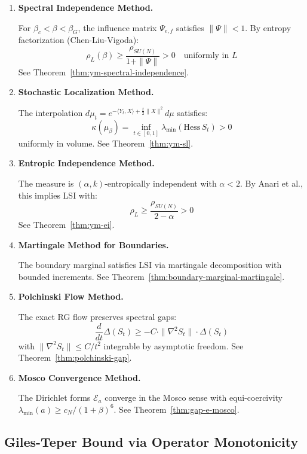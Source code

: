\begin{enumerate}[label=\textbf{M\arabic*.}]

\item \textbf{Spectral Independence Method.}

For $\beta_c < \beta < \beta_G$, the influence matrix $\Psi_{e,f}$ satisfies 
$\|\Psi\| < 1$. By entropy factorization (Chen-Liu-Vigoda):
\[
\rho_L(\beta) \geq \frac{\rho_{SU(N)}}{1 + \|\Psi\|} > 0 \quad \text{uniformly in } L
\]
See Theorem~\ref{thm:ym-spectral-independence}.

\item \textbf{Stochastic Localization Method.}

The interpolation $d\mu_t = e^{-\langle Y_t, X\rangle + \frac{t}{2}\|X\|^2} d\mu$ 
satisfies:
\[
\kappa(\mu_\beta) = \inf_{t \in [0,1]} \lambda_{\min}(\mathrm{Hess}\, S_t) > 0
\]
uniformly in volume. See Theorem~\ref{thm:ym-sl}.

\item \textbf{Entropic Independence Method.}

The measure is $(\alpha, k)$-entropically independent with $\alpha < 2$. 
By Anari et al., this implies LSI with:
\[
\rho_L \geq \frac{\rho_{SU(N)}}{2 - \alpha} > 0
\]
See Theorem~\ref{thm:ym-ei}.

\item \textbf{Martingale Method for Boundaries.}

The boundary marginal satisfies LSI via martingale decomposition with bounded 
increments. See Theorem~\ref{thm:boundary-marginal-martingale}.

\item \textbf{Polchinski Flow Method.}

The exact RG flow preserves spectral gaps:
\[
\frac{d}{dt} \Delta(S_t) \geq -C \cdot \|\nabla^2 S_t\| \cdot \Delta(S_t)
\]
with $\|\nabla^2 S_t\| \leq C/t^2$ integrable by asymptotic freedom.
See Theorem~\ref{thm:polchinski-gap}.

\item \textbf{Mosco Convergence Method.}

The Dirichlet forms $\mathcal{E}_a$ converge in the Mosco sense with 
equi-coercivity $\lambda_{\min}(a) \geq c_N/(1+\beta)^6$.
See Theorem~\ref{thm:gap-e-mosco}.

\end{enumerate}

\subsection{Giles-Teper Bound via Operator Monotonicity}

